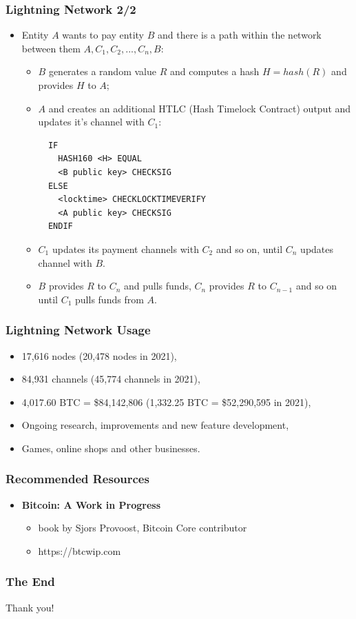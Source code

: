 \documentclass{beamer}
\begin{document}
\begin{frame}[fragile]
  \frametitle{Lightning Network 2/2}
  \begin{itemize}
  \item Entity $A$ wants to pay entity $B$ and there is a path within the network
    between them $A, C_1, C_2, ..., C_n, B$:
    \begin{itemize}
    \item $B$ generates a random value $R$ and computes a hash $H = hash(R)$ and
      provides $H$ to $A$;
    \item $A$ and creates an additional HTLC (Hash Timelock Contract) output and
      updates it's channel with $C_1$:
      \begin{verbatim}
  IF 
    HASH160 <H> EQUAL
    <B public key> CHECKSIG
  ELSE
    <locktime> CHECKLOCKTIMEVERIFY
    <A public key> CHECKSIG
  ENDIF
      \end{verbatim}
    \item $C_1$ updates its payment channels with $C_2$ and so on, until $C_n$
      updates channel with $B$.
    \item $B$ provides $R$ to $C_n$ and pulls funds, $C_n$ provides $R$ to
      $C_{n-1}$ and so on until $C_1$ pulls funds from $A$.
    \end{itemize}
  \end{itemize}
\end{frame}

\begin{frame}
  \frametitle{Lightning Network Usage}
  \begin{itemize}
  \item 17,616 nodes (20,478 nodes in 2021),
  \item 84,931 channels (45,774 channels in 2021),
  \item 4,017.60 BTC = \$84,142,806 (1,332.25 BTC = \$52,290,595 in 2021),
  \item Ongoing research, improvements and new feature development,
  \item Games, online shops and other businesses.
  \end{itemize}
\end{frame}

\begin{frame}
  \frametitle{Recommended Resources}
  \begin{itemize}
  \item \textbf{Bitcoin: A Work in Progress}
    \begin{itemize}
    \item book by Sjors Provoost, Bitcoin Core contributor
    \item https://btcwip.com
    \end{itemize}
  \end{itemize}
\end{frame}

\begin{frame}
  \frametitle{The End}
  \begin{center}
    Thank you!
  \end{center}
\end{frame}
\end{document}
